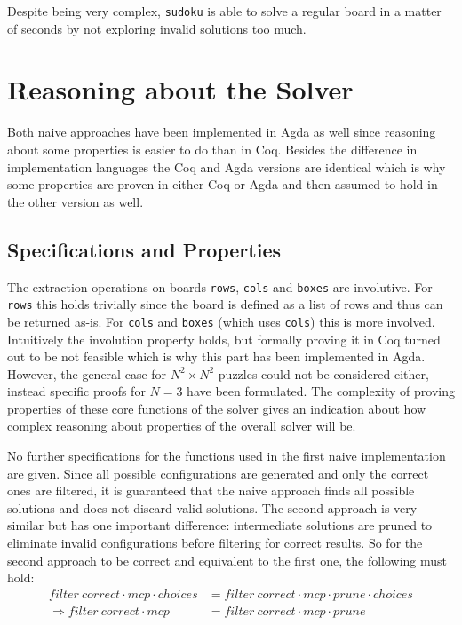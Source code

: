 \documentclass[a4paper,11pt]{article}
\begin{document}
Despite being very complex, \texttt{sudoku} is able to solve a regular board in a matter of seconds by not exploring invalid solutions too much.

\section{Reasoning about the Solver}
\label{sec:reas}
Both naive approaches have been implemented in Agda as well since reasoning about some properties is easier to do than in Coq. Besides the difference in implementation languages the Coq and Agda versions are identical which is why some properties are proven in either Coq or Agda and then assumed to hold in the other version as well.

\subsection{Specifications and Properties}
The extraction operations on boards \texttt{rows}, \texttt{cols} and \texttt{boxes} are involutive. For \texttt{rows} this holds trivially since the board is defined as a list of rows and thus can be returned as-is. For \texttt{cols} and \texttt{boxes} (which uses \texttt{cols}) this is more involved. Intuitively the involution property holds, but formally proving it in Coq turned out to be not feasible which is why this part has been implemented in Agda. However, the general case for \(N^2 \times N^2\) puzzles could not be considered either, instead specific proofs for \(N = 3\) have been formulated. The complexity of proving properties of these core functions of the solver gives an indication about how complex reasoning about properties of the overall solver will be.

No further specifications for the functions used in the first naive implementation are given. Since all possible configurations are generated and only the correct ones are filtered, it is guaranteed that the naive approach finds all possible solutions and does not discard valid solutions. The second approach is very similar but has one important difference: intermediate solutions are pruned to eliminate invalid configurations before filtering for correct results. So for the second approach to be correct and equivalent to the first one, the following must hold:
\begin{align*}
  filter~correct \cdot mcp \cdot choices &= filter~correct \cdot mcp \cdot prune \cdot choices\\
  \Rightarrow filter~correct \cdot mcp &= filter~correct \cdot mcp \cdot prune
\end{align*}
\end{document}
